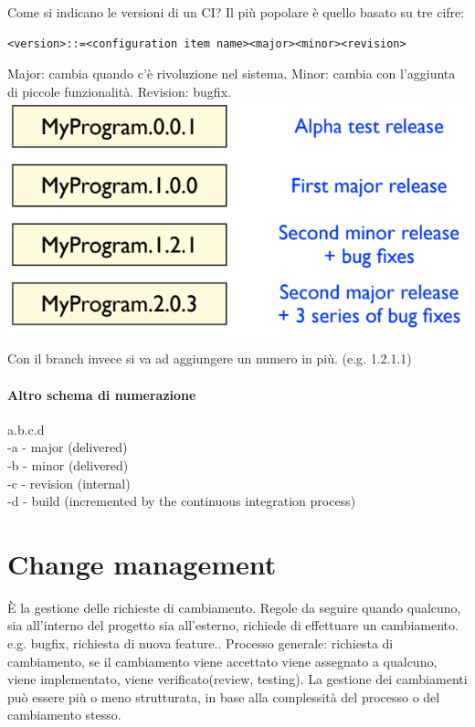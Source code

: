 \documentclass[10pt,a4paper]{book}
\begin{document}
Come si indicano le versioni di un CI?
Il più popolare è quello basato su tre cifre: \begin{verbatim}<version>::=<configuration item name><major><minor><revision> \end{verbatim}

Major: cambia quando c'è rivoluzione nel sistema.
Minor: cambia con l'aggiunta di piccole funzionalità.
Revision: bugfix.\\
\includegraphics[scale=0.45]{version.png} 

Con il branch invece si va ad aggiungere un numero in più. (e.g. 1.2.1.1)

\paragraph{Altro schema di numerazione}
a.b.c.d\\
-a - major (delivered)\\
-b - minor (delivered)\\
-c - revision (internal)\\
-d - build (incremented by the continuous integration process)\\

\newpage
\section{Change management}
\`{E} la gestione delle richieste di cambiamento. Regole da seguire quando qualcuno, sia all'interno del progetto sia all'esterno, richiede di effettuare un cambiamento. e.g. bugfix, richiesta di nuova feature..
Processo generale: richiesta di cambiamento, se il cambiamento viene accettato viene assegnato a qualcuno, viene implementato, viene verificato(review, testing).
La gestione dei cambiamenti può essere più o meno strutturata, in base alla complessità del processo o del cambiamento stesso.
\end{document}
